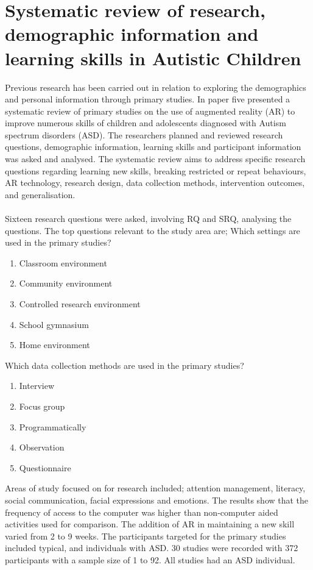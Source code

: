 \section{Systematic review of research, demographic information and learning skills in Autistic Children}
Previous research has been carried out in relation to exploring the demographics and personal information through primary studies. In paper five  presented a systematic review of primary studies on the use of augmented reality (AR) to improve numerous skills of children and adolescents diagnosed with Autism spectrum disorders (ASD). The researchers planned and reviewed research questions, demographic information, learning skills and participant information was asked and analysed. The systematic review aims to address specific research questions regarding learning new skills, breaking restricted or repeat behaviours, AR technology, research design, data collection methods, intervention outcomes, and generalisation.
\paragraph{}
Sixteen research questions were asked, involving RQ and SRQ, analysing the questions. The top questions relevant to the study area are; Which settings are used in the primary studies?
\begin{enumerate}
    \item Classroom environment
    \item Community environment
    \item Controlled research environment
    \item School gymnasium
    \item Home environment
\end{enumerate}
Which data collection methods are used in the primary studies?
\begin{enumerate}
    \item Interview
    \item Focus group
    \item Programmatically
    \item Observation
    \item Questionnaire
\end{enumerate}

Areas of study focused on for research included; attention management, literacy, social communication, facial expressions and emotions. The results show that the frequency of access to the computer was higher than non-computer aided activities used for comparison. The addition of AR in maintaining a new skill varied from 2 to 9 weeks.
The participants targeted for the primary studies included typical, and individuals with ASD. 30 studies were recorded with 372 participants with a sample size of 1 to 92. All studies had an ASD individual.

